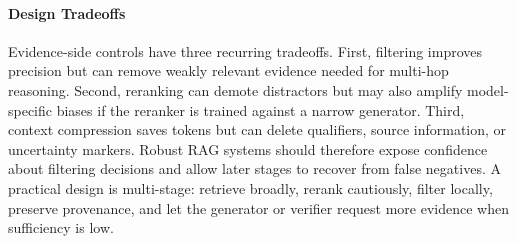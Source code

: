 \paragraph{Design Tradeoffs}

Evidence-side controls have three recurring tradeoffs. First, filtering improves precision but can remove weakly relevant evidence needed for multi-hop reasoning. Second, reranking can demote distractors but may also amplify model-specific biases if the reranker is trained against a narrow generator. Third, context compression saves tokens but can delete qualifiers, source information, or uncertainty markers. Robust RAG systems should therefore expose confidence about filtering decisions and allow later stages to recover from false negatives. A practical design is multi-stage: retrieve broadly, rerank cautiously, filter locally, preserve provenance, and let the generator or verifier request more evidence when sufficiency is low.
